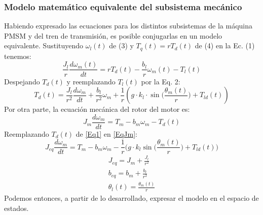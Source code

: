 \documentclass[12pt, a4paper,journal, onecolumn, compsoc]{IEEEtran}
\begin{document}
    \subsubsection{Modelo matemático equivalente del subsistema mecánico}
    Habiendo expresado las ecuaciones para los distintos subsistemas de la máquina PMSM y del tren de transmisión, es posible conjugarlas en un modelo equivalente.
    Sustituyendo \(\omega_l(t)\) de (3) y \(T_q(t) = rT_d(t)\) de (4) en la Ec. (1) tenemos:
    \begin{equation}\label{EqAux1}
        \frac{J_l}{r}\frac{d\omega_m(t)}{dt} = rT_d(t)-\frac{b_l}{r}\omega_m(t)-T_l(t)
    \end{equation}
    Despejando \(T_d(t)\) y reemplazando \(T_l(t)\) por la Eq. 2:
    \begin{equation}\label{Eq1}
        T_d(t)=\frac{J_l}{r^2}\frac{d\omega_m}{dt}+\frac{b_l}{r^2}\omega_m+\frac{1}{r}\left(g\cdot k_l\cdot \sin\Big(\frac{\theta_m(t)}{r}\Big)+T_{ld}(t)\right)
    \end{equation}
    Por otra parte, la ecuación mecánica del rotor del motor es:
    \begin{equation}\label{EqJm}
        J_m\frac{d\omega_m}{dt}=T_m-b_m\omega_m-T_d(t)
    \end{equation}
    Reemplazando \(T_d(t)\) de \eqref{Eq1} en  \eqref{EqJm}:
    \begin{equation}
        J_{eq}\frac{d\omega_m}{dt}=T_m-b_m\omega_m-\frac{1}{r}\Big(g\cdot k_l \sin{\Big(\frac{\theta_m(t)}{r}\Big)} + T_{ld}(t)\Big)
    \end{equation}
    \begin{gather}
        J_{eq} = J_m +\frac{J_l}{r^2}\\
        b_{eq} = b_m + \frac{b_l}{r^2}\\
        \theta_l(t)=\frac{\theta_m(t)}{r}
    \end{gather}
    Podemos entonces, a partir de lo desarrollado, expresar el modelo en el espacio de estados.
\end{document}

